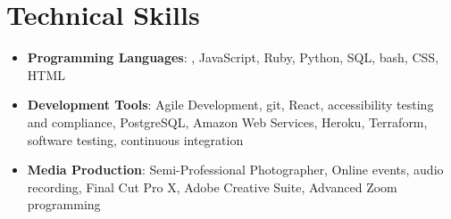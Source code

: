 \section{Technical Skills}

\vspace{6pt}

\begin{itemize}

  \setlength\itemsep{1em}
    \item{\textbf{Programming Languages}: \snap, JavaScript, Ruby, Python, SQL, bash, CSS, HTML}
    
    \item{\textbf{Development Tools}: Agile Development, git, React, accessibility testing and compliance, PostgreSQL, Amazon Web Services, Heroku, Terraform, software testing, continuous integration}
    
    \item{\textbf{Media Production}: Semi-Professional Photographer, Online events, audio recording, Final Cut Pro X, Adobe Creative Suite, Advanced Zoom programming}


\end{itemize}







